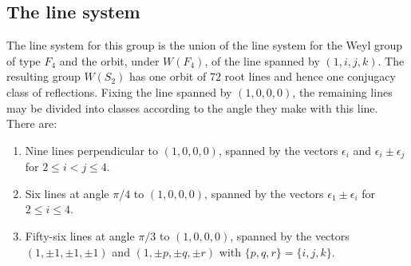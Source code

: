 \documentclass[11pt, reqno]{amsart}
\numberwithin{equation}{section}
\theoremstyle{definition}
\theoremstyle{plain}
\begin{document}
\subsection{The line system} The line system for this group is the union of the line system for the Weyl group of type $F_4$ and the orbit, under $W(F_4)$, of the line spanned by $(1,i,j,k)$. The resulting group $W(S_2)$ has one orbit of $72$ root lines and hence one conjugacy class of reflections. Fixing the line spanned by $(1,0,0,0)$, the remaining lines may be divided into classes according to the angle they make with this line. There are:
\begin{enumerate}
\item[(a)] Nine lines perpendicular to $(1,0,0,0)$, spanned by the vectors $\epsilon_i$ and $\epsilon_i \pm \epsilon_j$ for $2 \leq i < j \leq 4$.

\item[(b)] Six lines at angle $\pi/4$ to $(1,0,0,0)$, spanned by the vectors $\epsilon_1 \pm \epsilon_i$ for $2 \leq i \leq 4$.

\item[(c)] Fifty-six lines at angle $\pi/3$ to $(1,0,0,0)$, spanned by the vectors $(1,\pm 1,\pm 1, \pm 1)$ and $(1, \pm p, \pm q, \pm r)$ with $\{p,q,r \}=\{i,j,k\}$. 
\end{enumerate}
\end{document}
